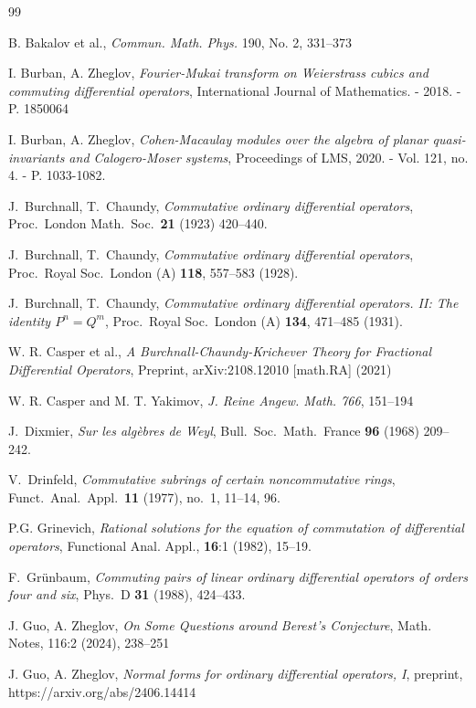 \documentclass[11pt]{article}
\theoremstyle{definition}
\theoremstyle{plain}
\numberwithin{equation}{section}
\begin{document}
\begin{thebibliography}{99}


 B. Bakalov et al., {\em Commun. Math. Phys.} 190, No. 2, 331--373

 I. Burban, A. Zheglov, {\em Fourier-Mukai transform on Weierstrass cubics and commuting differential operators}, International Journal of Mathematics. - 2018. - P. 1850064

 I. Burban, A. Zheglov, {\em Cohen-Macaulay modules over the algebra of planar quasi-invariants and Calogero-Moser systems}, Proceedings of LMS, 2020. - Vol. 121, no. 4. - P. 1033-1082. 

 J.~Burchnall, T.~Chaundy, \emph{Commutative ordinary differential operators},
 Proc.~London Math.~Soc.~\textbf{21}  (1923) 420--440.
 
 J.~Burchnall, T.~Chaundy, \emph{Commutative ordinary differential operators},
Proc.~Royal Soc.~London (A) \textbf{118}, 557--583 (1928).

 J.~Burchnall, T.~Chaundy, \emph{Commutative ordinary differential operators. II: The identity $P^n =Q^m$},
Proc.~Royal Soc.~London (A) \textbf{134}, 471--485 (1931).

 W. R. Casper et al., {\em A Burchnall-Chaundy-Krichever Theory for Fractional Differential Operators}, Preprint, arXiv:2108.12010 [math.RA] (2021)

 W. R. Casper and M. T. Yakimov, {\em J. Reine Angew. Math. 766}, 151--194 

 J.~Dixmier, \textit{Sur les alg\`ebres de Weyl},  Bull.~Soc.~Math.~France \textbf{96} (1968) 209--242.

 V.~Drinfeld, \emph{Commutative subrings of certain noncommutative rings}, Funct.~Anal.~Appl.~\textbf{11} (1977), no.~1, 11--14, 96.


 P.G. Grinevich, {\it Rational solutions for the equation of commutation of differential operators}, Functional Anal. Appl., {\bf 16}:1 (1982), 15--19.

 F.~Gr\"unbaum, \textit{Commuting pairs of linear ordinary differential operators of orders four and six}, Phys.~D \textbf{31} (1988), 424--433.


 J. Guo, A. Zheglov, {\it On Some Questions around Berest's Conjecture}, Math. Notes, 116:2 (2024), 238–251

 J. Guo, A. Zheglov, {\it Normal forms for ordinary differential operators, I}, preprint, https://arxiv.org/abs/2406.14414


\end{thebibliography}
\end{document}
